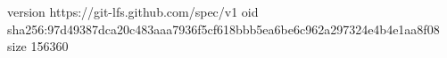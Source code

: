 version https://git-lfs.github.com/spec/v1
oid sha256:97d49387dca20c483aaa7936f5cf618bbb5ea6be6c962a297324e4b4e1aa8f08
size 156360
